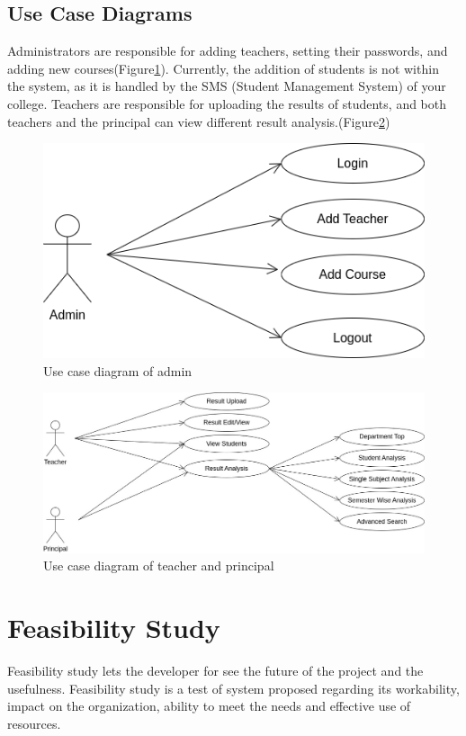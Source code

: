 \documentclass{nascproject}
\begin{document}
\subsection{Use Case Diagrams}
	Administrators are responsible for adding teachers, setting their passwords, and adding new courses(Figure\ref{usecase1}). Currently, the addition of students is not within the system, as it is handled by the SMS (Student Management System) of your college. Teachers are responsible for uploading the results of students, and both teachers and the principal can view different result analysis.(Figure\ref{usecase2})
\begin{figure}
	\centering
	\includegraphics[width=1\linewidth]{usecase2.png}
	\caption{Use case diagram of admin}
	\label{usecase1}
\end{figure}
\begin{figure}
	\centering
	\includegraphics[width=1\linewidth]{usecase1.jpg}
	\caption{Use case diagram of teacher and principal}
	\label{usecase2}
\end{figure}
\section{Feasibility Study}
Feasibility study lets the developer for see the future of the project and the usefulness.
Feasibility study is a test of system proposed regarding its workability, impact on the
organization, ability to meet the needs and effective use of resources.
\end{document}
